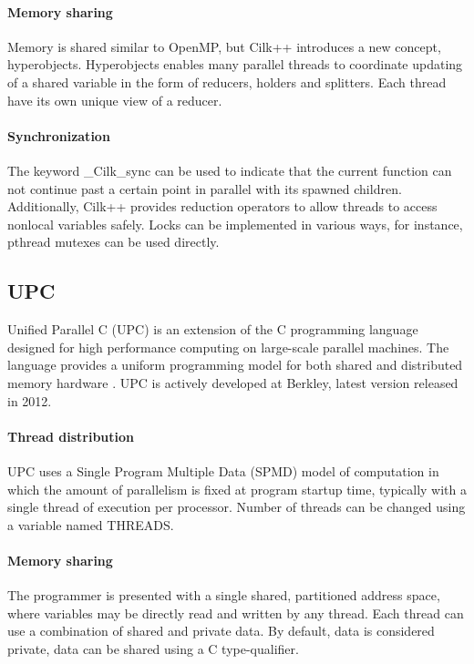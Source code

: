 \paragraph{Memory sharing} Memory is shared similar to OpenMP, but
Cilk++ introduces a new concept, hyperobjects. Hyperobjects enables
many parallel threads to coordinate updating of a shared variable in
the form of reducers, holders and splitters. Each thread have its own
unique view of a reducer.

\paragraph{Synchronization} The keyword \_Cilk\_sync can be used to
indicate that the current function can not continue past a certain
point in parallel with its spawned children. Additionally, Cilk++
provides reduction operators to allow threads to access nonlocal
variables safely. Locks can be implemented in various ways, for
instance, pthread mutexes can be used directly.

\subsection{UPC}

Unified Parallel C (UPC) is an extension of the C programming language
designed for high performance computing on large-scale parallel
machines. The language provides a uniform programming model for both
shared and distributed memory hardware \cite{upc}. UPC is actively
developed at Berkley, latest version released in 2012.

\paragraph{Thread distribution} UPC uses a Single Program Multiple
Data (SPMD) model of computation in which the amount of parallelism is
fixed at program startup time, typically with a single thread of
execution per processor. Number of threads can be changed using a
variable named THREADS.

\paragraph{Memory sharing} The programmer is presented with a single
shared, partitioned address space, where variables may be directly
read and written by any thread. Each thread can use a combination of
shared and private data. By default, data is considered private, data
can be shared using a C type-qualifier.

